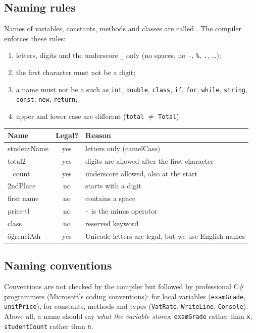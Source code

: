 \subsection{Naming rules}
Names of variables, constants, methods and classes are called . The compiler enforces these rules:
\begin{enumerate}[leftmargin=*,itemsep=1pt]
  \item letters, digits and the underscore \texttt{\_} only (no spaces, no \texttt{-}, \texttt{\%}, \texttt{.}, \dots);
  \item the first character must not be a digit;
  \item a name must not be a  such as \texttt{int}, \texttt{double}, \texttt{class}, \texttt{if}, \texttt{for}, \texttt{while}, \texttt{string}, \texttt{const}, \texttt{new}, \texttt{return};
  \item upper and lower case are different (\texttt{total} $\ne$ \texttt{Total}).
\end{enumerate}
\begin{center}\small
\begin{tabular}{>{\ttfamily}l c l}
\toprule
\normalfont\textbf{Name} & \textbf{Legal?} & \textbf{Reason}\\ \midrule
studentName & \textcolor{repc}{yes} & letters only (camelCase)\\
total2 & \textcolor{repc}{yes} & digits are allowed after the first character\\
\_count & \textcolor{repc}{yes} & underscore allowed, also at the start\\
2ndPlace & \textcolor{errc}{no} & starts with a digit\\
first name & \textcolor{errc}{no} & contains a space\\
price-tl & \textcolor{errc}{no} & \texttt{-} is the minus operator\\
class & \textcolor{errc}{no} & reserved keyword\\
öğrenciAdı & \textcolor{amberdk}{yes} & Unicode letters are legal, but we use English names\\ \bottomrule
\end{tabular}
\end{center}

\subsection{Naming conventions}
Conventions are not checked by the compiler but followed by professional C\# programmers (Microsoft's coding conventions):  for local variables (\texttt{examGrade}, \texttt{unitPrice}),  for constants, methods and types (\texttt{VatRate}, \texttt{WriteLine}, \texttt{Console}). Above all, a name should say \emph{what the variable stores}: \texttt{examGrade} rather than \texttt{x}, \texttt{studentCount} rather than \texttt{n}.

